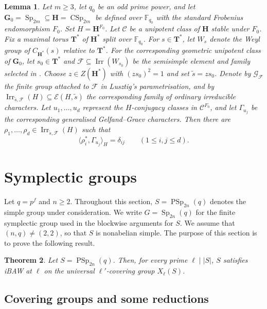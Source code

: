 \documentclass[10pt]{amsart}
\newtheorem{theorem}{Theorem}[section]
\newtheorem{lemma}[theorem]{Lemma}
\theoremstyle{definition}
\renewcommand{\leq}{\leqslant}
\renewcommand{\geq}{\geqslant}
\DeclareMathOperator{\Irr}{Irr}
\DeclareMathOperator{\Sp}{Sp}
\DeclareMathOperator{\PSp}{PSp}
\DeclareMathOperator{\CSp}{CSp}
\numberwithin{equation}{section}
\numberwithin{table}{section}
\begin{document}
\begin{lemma}\label{lem:symplectic-gggr-selection}
Let $m\geq3$, let $q_0$ be an odd prime power, and let
$\mathbf G_0=\Sp_{2m}\subseteq\mathbf H=\CSp_{2m}$ be defined over
$\mathbb F_{q_0}$ with the standard Frobenius endomorphism $F_0$.
Set $H=\mathbf H^{F_0}$.
Let $\mathcal C$ be a unipotent class of $\mathbf H$ stable under $F_0$.
Fix a maximal torus $\mathbf T^*$ of $\mathbf H^*$ split over
$\mathbb F_{q_0}$. For $s\in\mathbf T^*$, let $W_s$ denote the Weyl
group of $C_{\mathbf H^*}(s)$ relative to $\mathbf T^*$.
For the corresponding geometric unipotent class of $\mathbf G_0$,
let $s_0\in\mathbf T^*$ and $\mathcal F\subseteq\Irr(W_{s_0})$ be
the semisimple element and family selected in
\cite[10.1--10.3]{Taylor2014Maximal}.
Choose $z\in Z(\mathbf H^*)$ with $(zs_0)^2=1$ and set
$\widetilde s=zs_0$.
Denote by $\mathcal G_{\mathcal F}$ the finite group attached to
$\mathcal F$ in Lusztig's parametrisation, and by
$\Irr_{\widetilde s,\mathcal F}(H)\subseteq\mathcal E(H,\widetilde s)$
the corresponding family of ordinary irreducible characters.
Let $u_1,\ldots,u_d$ represent the $H$-conjugacy classes in $\mathcal C^{F_0}$,
and let $\Gamma_{u_j}$ be the corresponding generalised
Gelfand--Graev characters. Then there are
$\rho_1,\ldots,\rho_d\in\Irr_{\widetilde s,\mathcal F}(H)$ such that
\[
 \langle\rho_i^*,\Gamma_{u_j}\rangle_H=\delta_{ij}
 \qquad(1\leq i,j\leq d).
\]
\end{lemma}


\section{Symplectic groups}\label{sec:symplectic}

Let $q=p^f$ and $n\geq2$.  Throughout this section,
$S=\PSp_{2n}(q)$ denotes the simple group under consideration.  We write
$G=\Sp_{2n}(q)$ for the finite symplectic group used in the blockwise
arguments for $S$.
We assume that $(n,q)\neq(2,2)$, so that $S$ is nonabelian
simple. The purpose of this section is to prove the following result.

\begin{theorem}\label{thm:symplectic}
Let $S=\PSp_{2n}(q)$. Then, for every prime $\ell\mid |S|$, $S$ satisfies iBAW at $\ell$ on
the universal $\ell'$-covering group $X_\ell(S)$.
\end{theorem}

\subsection{Covering groups and some reductions}
\end{document}
